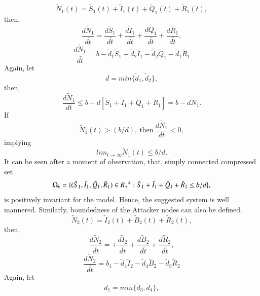 \begin{equation*} \tilde N_1(t) =\tilde S_1 (t)+\tilde I_1 (t)+\tilde Q_1 (t)+ \tilde R_1 (t),\end{equation*}
then,
\begin{equation*}\frac{d \tilde N_1}{d \tilde t} = \frac{d \tilde S_1}{d \tilde t}+\frac{d \tilde I_1}{d \tilde t}+
\frac{d \tilde Q_1}{d \tilde t}+\frac{d\tilde R_1}{d \tilde t},\end{equation*}
\begin{equation} \frac{d \tilde N_1}{d \tilde t}=b-\tilde d_1 \tilde S_1-\tilde d_2 \tilde I_1-\tilde d_2 \tilde Q_1-\tilde d_1 \tilde R_1\end{equation}
Again, let
\begin{equation*} d = min\{\tilde d_1,\tilde d_2\},\end{equation*}
then,
\begin{equation*}\frac{d \tilde N_1}{dt} \leq b - d[ \tilde S_1 + \tilde I_1 + \tilde Q_1 + \tilde R_1] = b - d \tilde N_1. \end{equation*}
If \begin{equation*} \tilde N_1(t) > (b/d), \ \mbox{then} \ \frac{d \tilde N_1}{d t} < 0,\end{equation*} implying \begin{equation*}lim_{t \rightarrow \infty} \tilde N_1(t)\leq b/d .\end{equation*}
It can be seen after a moment of observation, that, simply connected compressed set
\begin{equation}\Omega_k = \{( \tilde S_1, \tilde I_1, \tilde Q_1, \tilde R_1) \in R_+ \textsuperscript{4} : \tilde S_1+ \tilde I_1 + \tilde Q_1 + \tilde R_1 \leq b/d \},\end{equation}
is positively invariant for the model. Hence, the suggested system is well mannered.
Similarly, boundedness of the Attacker nodes can also be defined.
\begin{equation*} \tilde N_2(t) =\tilde I_2 (t)+\tilde B_2 (t)+ \tilde R_2 (t),\end{equation*}
then,
\begin{equation*}\frac{d \tilde N_2}{d \tilde t} = +\frac{d \tilde I_2}{d \tilde t}+\frac{d \tilde B_2}{d \tilde t}+\frac{d \tilde R_2}{d \tilde t},\end{equation*}
\begin{equation} \frac{d \tilde N_2}{d \tilde t}=b_1-\tilde d_4 \tilde I_2-\tilde d_4 \tilde B_2-\tilde d_3 \tilde R_2\end{equation}
Again, let
\begin{equation*} d_1= min\{\tilde d_3,\tilde d_4\},\end{equation*}
